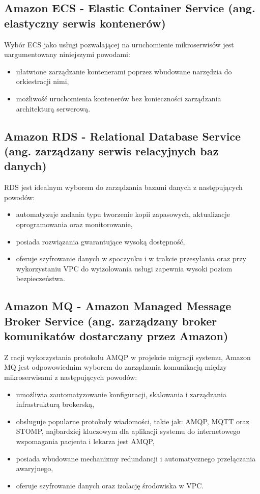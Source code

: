 \documentclass[12pt,twoside]{book}
\begin{document}
\subsection{Amazon ECS - Elastic Container Service (ang. elastyczny serwis kontenerów)}
Wybór ECS jako usługi pozwalającej na uruchomienie mikroserwisów jest uargumentowany niniejszymi powodami:

\begin{itemize}
\item ułatwione zarządzanie kontenerami poprzez wbudowane narzędzia do orkiestracji nimi,
\item możliwość uruchomienia kontenerów bez konieczności zarządzania architekturą serwerową. \cite{aws.ecs}
\end{itemize}

\subsection{Amazon RDS - Relational Database Service (ang. zarządzany serwis relacyjnych baz danych)}
RDS jest idealnym wyborem do zarządzania bazami danych z następujących powodów:

\begin{itemize}
\item automatyzuje zadania typu tworzenie kopii zapasowych, aktualizacje oprogramowania oraz monitorowanie,
\item posiada rozwiązania gwarantujące wysoką dostępność,
\item oferuje szyfrowanie danych w spoczynku i w trakcie przesyłania oraz przy wykorzystaniu VPC do wyizolowania usługi zapewnia wysoki poziom bezpieczeństwa. \cite{aws.rds}
\end{itemize}

\subsection{Amazon MQ - Amazon Managed Message Broker Service  (ang. zarządzany broker komunikatów dostarczany przez Amazon)}
Z racji wykorzystania protokołu AMQP w projekcie migracji systemu, Amazon MQ jest odpowowiednim wyborem do zarządzania komunikacją między mikroserwisami z następujących powodów:

\begin{itemize}
\item umożliwia zautomatyzowanie konfiguracji, skalowania i zarządzania infrastrukturą brokerską,
\item obsługuje popularne protokoły wiadomości, takie jak: AMQP, MQTT oraz STOMP, najbardziej kluczowym dla aplikacji systemu do internetowego wspomagania pacjenta i lekarza jest AMQP,
\item posiada wbudowane mechanizmy redundancji i automatycznego przełączania awaryjnego,
\item oferuje szyfrowanie danych oraz izolację środowiska w VPC. \cite{aws.mq}
\end{itemize}
\end{document}
